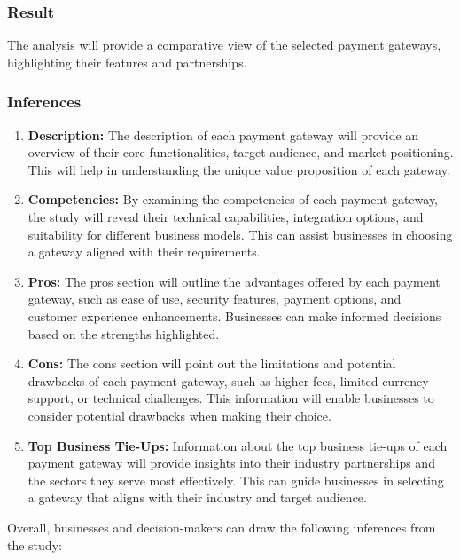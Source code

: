 \subsubsection{Result}
The analysis will provide a comparative view of the selected payment gateways, highlighting their features and partnerships.

\subsubsection{Inferences}
\begin{enumerate}
    \item \textbf{Description:} The description of each payment gateway will provide an overview of their core functionalities, target audience, and market positioning. This will help in understanding the unique value proposition of each gateway.
    
    \item \textbf{Competencies:} By examining the competencies of each payment gateway, the study will reveal their technical capabilities, integration options, and suitability for different business models. This can assist businesses in choosing a gateway aligned with their requirements.
    
    \item \textbf{Pros:} The pros section will outline the advantages offered by each payment gateway, such as ease of use, security features, payment options, and customer experience enhancements. Businesses can make informed decisions based on the strengths highlighted.
    
    \item \textbf{Cons:} The cons section will point out the limitations and potential drawbacks of each payment gateway, such as higher fees, limited currency support, or technical challenges. This information will enable businesses to consider potential drawbacks when making their choice.
    
    \item \textbf{Top Business Tie-Ups:} Information about the top business tie-ups of each payment gateway will provide insights into their industry partnerships and the sectors they serve most effectively. This can guide businesses in selecting a gateway that aligns with their industry and target audience.
\end{enumerate}

Overall, businesses and decision-makers can draw the following inferences from the study:


